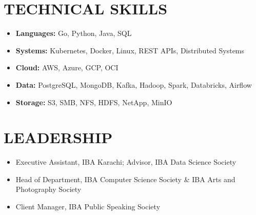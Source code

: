 \documentclass[a4paper,9pt]{article}
\begin{document}

\section{TECHNICAL SKILLS}

\begin{itemize}
    \item \textbf{Languages:} Go, Python, Java, SQL
    \item \textbf{Systems:} Kubernetes, Docker, Linux, REST APIs, Distributed Systems
    \item \textbf{Cloud:} AWS, Azure, GCP, OCI
    \item \textbf{Data:} PostgreSQL, MongoDB, Kafka, Hadoop, Spark, Databricks, Airflow
    \item \textbf{Storage:} S3, SMB, NFS, HDFS, NetApp, MinIO
\end{itemize}


\section{LEADERSHIP}

\begin{itemize}
    \item Executive Assistant, IBA Karachi; Advisor, IBA Data Science Society
    \item Head of Department, IBA Computer Science Society \& IBA Arts and Photography Society
    \item Client Manager, IBA Public Speaking Society
\end{itemize}
\end{document}
